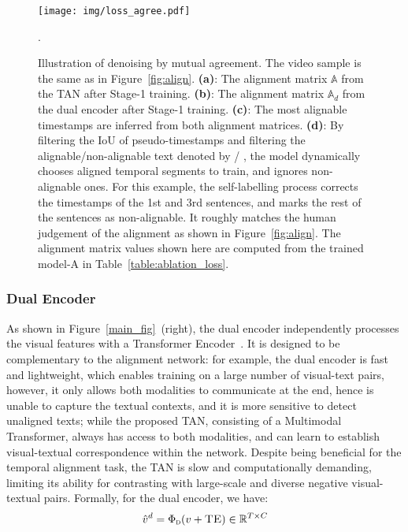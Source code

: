 \begin{figure*}[t]
	\texttt{[image: img/loss\_agree.pdf]}
	\vspace*{-8mm}
	\caption{\footnotesize{
    Illustration of denoising by mutual agreement.
    The video sample is the same as in Figure~\ref{fig:align}.
	\textbf{(a)}: The alignment matrix $\mathbb{A}$ from the TAN after Stage-1 training.
	\textbf{(b)}: The alignment matrix $\mathbb{A}_d$ from the dual encoder
	after Stage-1 training.
	\textbf{(c)}: The most alignable timestamps are inferred from both alignment matrices.
	\textbf{(d)}: By filtering the IoU of pseudo-timestamps 
	and filtering the alignable/non-alignable 
    text denoted by \textcolor{googleblue}{\textbf{\cmark}} / 
    \textcolor{googleorange}{\textbf{\xmark}},
	the model dynamically chooses aligned temporal segments to train,
	and ignores non-alignable ones.
	For this example, the self-labelling process corrects the timestamps of the 1st and 3rd sentences, 
	and marks the rest of the sentences as non-alignable.
	It roughly matches the human judgement of the alignment
	as shown in Figure~\ref{fig:align}.
	The alignment matrix values shown here are computed from the trained model-A in Table~\ref{table:ablation_loss}.}}
	\vspace{-6mm}.
	\label{fig:loss}
\end{figure*}

\vspace{-4mm}
\subsubsection{Dual Encoder}
\vspace{-2mm}
\label{subsubsec:dual_enc}
As shown in Figure~\ref{main_fig}~(right),
the dual encoder independently processes the visual features with a Transformer Encoder~\cite{Vaswani17}.
It is designed to be complementary to the alignment network:
for example, the dual encoder is fast and lightweight, 
which enables training on a large number of visual-text pairs,
however, it only allows both modalities to communicate at the end, 
hence is unable to capture the textual contexts, 
and it is more sensitive to detect unaligned texts;
while the proposed TAN, consisting of a Multimodal Transformer,
always has access to both modalities, and can learn to establish visual-textual correspondence within the network. 
Despite being beneficial for the temporal alignment task,
the TAN  is slow and computationally demanding, limiting its ability for contrasting with large-scale and diverse negative visual-textual pairs. 
Formally, for the dual encoder, we have: 
\vspace{-3mm}
\begin{align}
    \hat{v}^{d} = \Phi_{\textsc{d}}(v + \textsc{TE}) \in \mathbb{R}^{T\times C}
\end{align}
\vspace{-4mm}

